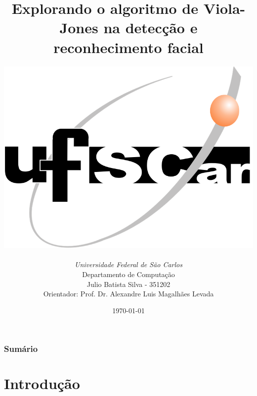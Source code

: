 \documentclass[xcolor=x11names,compress]{beamer}
\renewcommand{\(}{\begin{columns}}
\renewcommand{\)}{\end{columns}}
\newcommand{\<}[1]{\begin{column}{#1}}
\renewcommand{\>}{\end{column}}
\begin{document}

\begin{frame}
\title{Explorando o algoritmo de Viola-Jones na detecção e reconhecimento facial}
\author{
    \centerline{\noindent\includegraphics[scale=0.15]{ufscar.png}}\\
    {\it Universidade Federal de São Carlos}\\
    Departamento de Computação\\
    {Julio Batista Silva - 351202}\\
    {Orientador: Prof. Dr. Alexandre Luis Magalhães Levada}\\
}
\date{\today}
\titlepage
\end{frame}


\begin{frame}
    \frametitle{Sumário}
    \tableofcontents
\end{frame}


\section{Introdução}
\subsection{}
\end{document}
